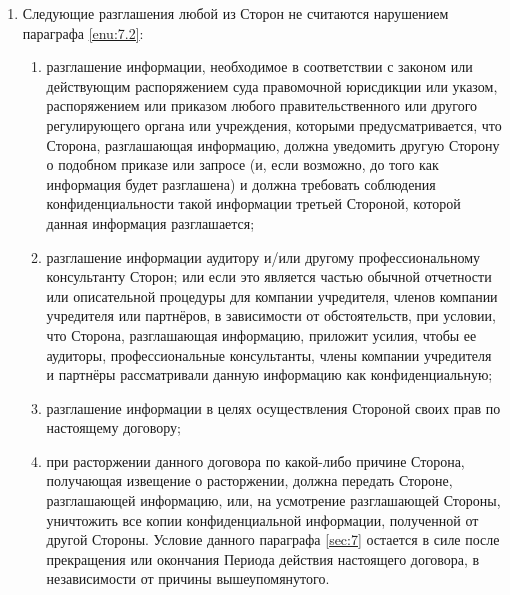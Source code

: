 \begin{Form}
\begin{enumerate}[label=\thesection.\arabic*.]
\begin{enumerate}[label=\theenumi\arabic*.]
            \end{enumerate}
      \item Следующие разглашения любой из Сторон  не считаются нарушением параграфа \ref{enu:7.2}:
            \begin{enumerate}[label=\theenumi\arabic*.]
              \item разглашение информации, необходимое в соответствии с законом или действующим распоряжением суда правомочной
                    юрисдикции или указом, распоряжением или приказом любого правительственного или другого регулирующего
                    органа или учреждения, которыми предусматривается, что Сторона,  разглашающая информацию, должна уведомить другую
                    Сторону  о подобном приказе или запросе (и, если возможно, до того как информация будет разглашена) и должна
                    требовать соблюдения конфиденциальности такой информации третьей Стороной, которой данная информация
                    разглашается;
              \item разглашение информации аудитору и/или другому профессиональному консультанту Сторон;
                    или если это является частью обычной отчетности или описательной процедуры для компании учредителя,
                    членов компании учредителя или партнёров, в зависимости от обстоятельств, при условии, что Сторона,
                    разглашающая информацию, приложит усилия, чтобы ее аудиторы, профессиональные консультанты, члены
                    компании учредителя и партнёры рассматривали данную информацию как конфиденциальную;
              \item разглашение информации в целях осуществления Стороной своих прав по настоящему договору;
              \item при расторжении данного договора по какой-либо причине Сторона, получающая извещение о расторжении,
                    должна передать Стороне, разглашающей информацию, или, на усмотрение разглашающей Стороны, уничтожить
                    все копии конфиденциальной информации, полученной от другой Стороны. Условие данного параграфа
                    \ref{sec:7} остается в силе после прекращения или окончания Периода действия настоящего договора,
                    в независимости от причины вышеупомянутого.
            \end{enumerate}
     \end{enumerate}



\end{Form}
